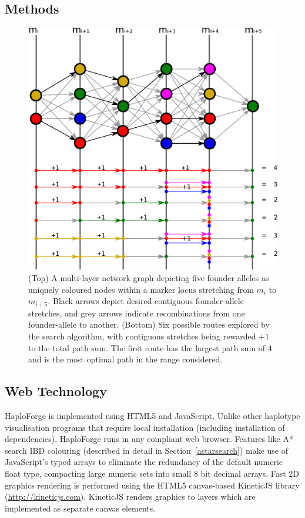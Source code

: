 \documentclass{bioinfo}
\numberwithin{equation}{section}
\def\haplo{{HaploForge}}
\begin{document}
\begin{methods}

\section{Methods}

\begin{figure}[!tpb]
	\centerline{\includegraphics[scale=0.4]{path_finder.5.eps}}\caption{(Top) A multi-layer network graph depicting five founder alleles as uniquely coloured nodes within a marker locus stretching from $m_i$ to $m_{i+5}$. Black arrows depict desired contiguous founder-allele stretches, and grey arrows indicate recombinations from one founder-allele to another. (Bottom) Six possible routes explored by the search algorithm, with contiguous stretches being rewarded $+1$ to the total path sum. The first route has the largest path sum of 4 and is the most optimal path in the range considered.}\label{fig:pathfind}
\end{figure}


\subsection{Web Technology}

\haplo{} is implemented using HTML5 and JavaScript. Unlike other haplotype visualisation programs that require local installation (including installation of dependencies), \haplo{} runs in any compliant web browser. Features like A* search IBD colouring (described in detail in Section~\ref{astarsearch}) make use of JavaScript's typed arrays to eliminate the redundancy of the default numeric float type, compacting large numeric sets into small 8 bit decimal arrays. Fast 2D graphics rendering is performed using the HTML5 canvas-based {KineticJS library (\url{http://kineticjs.com})}. KineticJS renders graphics to layers which are implemented as separate canvas elements. 


\end{methods}
\end{document}
